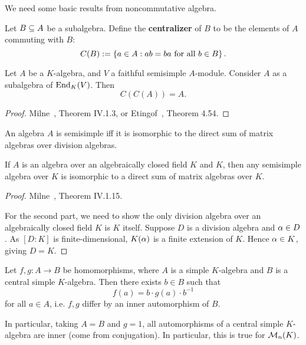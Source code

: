 We need some basic results from noncommutative algebra.
\begin{df}
Let $B\subeq A$ be a subalgebra. Define the \textbf{centralizer} of $B$ to be the elements of $A$ commuting with $B$:
\[
C(B):=\set{a\in A}{ab=ba\text{ for all }b\in B}.
\]
\end{df}
\begin{thm}
Let $A$ be a $K$-algebra, and $V$ a faithful semisimple $A$-module. Consider $A$ as a subalgebra of $\End_K(V)$. Then
\[
C(C(A))=A.
\]
\end{thm}
\begin{proof}
Milne~\cite{Mi08}, Theorem IV.1.3, or Etingof~\cite{Et10}, Theorem 4.54.
\end{proof}
\begin{thm}
An algebra $A$ is semisimple iff it is isomorphic to the direct sum of matrix algebras over division algebras.

If $A$ is an algebra over an algebraically closed field $K$ and $K$, then any semisimple algebra over $K$ is isomorphic to a direct sum of matrix algebras over $K$.
\end{thm}
\begin{proof}
Milne~\cite{Mi08}, Theorem IV.1.15.

For the second part, we need to show the only division algebra over an algebraically closed field $K$ is $K$ itself. Suppose $D$ is a division algebra and $\al\in D$. As $[D:K]$ is finite-dimensional, $K(\al)$ is a finite extension of $K$. Hence $\al\in K$, giving $D=K$.
\end{proof}
\begin{thm}
Let $f,g:A\to B$ be homomorphisms, where $A$ is a simple $K$-algebra and $B$ is a central simple $K$-algebra. Then there exists $b\in B$ such that 
\[
f(a)=b\cdot g(a)\cdot b^{-1}
\]
for all $a\in A$, i.e. $f,g$ differ by an inner automorphism of $B$.

In particular, taking $A=B$ and $g=1$, all automorphisms of a central simple $K$-algebra are inner (come from conjugation). In particular, this is true for $\cal M_n(K)$. 
\end{thm}
